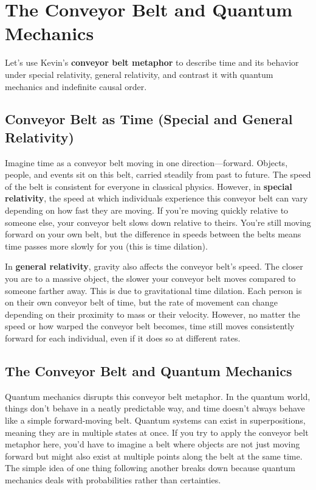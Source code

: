 \documentclass[../../../OAE-SPEC-MAIN.tex]{subfiles}
\begin{document}
\section{The Conveyor Belt and Quantum Mechanics}

Let's use Kevin’s \textbf{conveyor belt metaphor} to describe time and its behavior under special relativity, general relativity, and contrast it with quantum mechanics and indefinite causal order.

\subsection{Conveyor Belt as Time (Special and General Relativity)}

Imagine time as a conveyor belt moving in one direction—forward. Objects, people, and events sit on this belt, carried steadily from past to future. The speed of the belt is consistent for everyone in classical physics. However, in \textbf{special relativity}, the speed at which individuals experience this conveyor belt can vary depending on how fast they are moving. If you're moving quickly relative to someone else, your conveyor belt slows down relative to theirs. You’re still moving forward on your own belt, but the difference in speeds between the belts means time passes more slowly for you (this is time dilation).

In \textbf{general relativity}, gravity also affects the conveyor belt’s speed. The closer you are to a massive object, the slower your conveyor belt moves compared to someone farther away. This is due to gravitational time dilation. Each person is on their own conveyor belt of time, but the rate of movement can change depending on their proximity to mass or their velocity. However, no matter the speed or how warped the conveyor belt becomes, time still moves consistently forward for each individual, even if it does so at different rates.

\subsection{The Conveyor Belt and Quantum Mechanics}

Quantum mechanics disrupts this conveyor belt metaphor. In the quantum world, things don't behave in a neatly predictable way, and time doesn’t always behave like a simple forward-moving belt. Quantum systems can exist in superpositions, meaning they are in multiple states at once. If you try to apply the conveyor belt metaphor here, you'd have to imagine a belt where objects are not just moving forward but might also exist at multiple points along the belt at the same time. The simple idea of one thing following another breaks down because quantum mechanics deals with probabilities rather than certainties.
\end{document}
